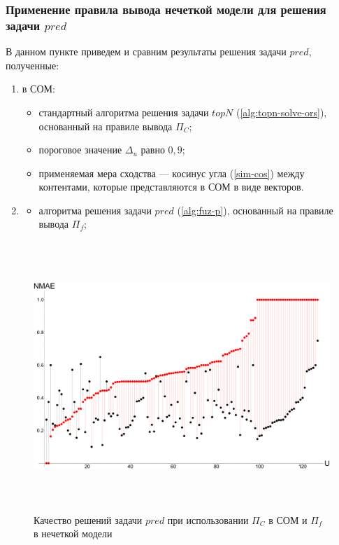 \subsubsection{Применение правила вывода нечеткой модели для решения задачи
$pred$}
В данном пункте приведем и сравним результаты решения задачи $pred$, полученные:
\begin{enumerate}
	\item в СОМ:
		\begin{itemize}
			\item
			стандартный алгоритма решения задачи
			$topN$ (\ref{alg:topn-solve-ors}), основанный на
			правиле вывода $\Pi_C$;
			\item
			пороговое значение $\Delta_u$ равно $0,9$;
			\item
		применяемая мера сходства --- косинус угла (\ref{sim-cos})
		между контентами, которые представляются в СОМ в виде векторов.
		\end{itemize}
	\item
		\begin{itemize}
			\item
			алгоритма решения задачи
			$pred$ (\ref{alg:fuz-p}), основанный на
			правиле вывода $\Pi_f$;
		\end{itemize}
\end{enumerate}


\begin{figure}[H]
	\caption{Качество решений задачи $pred$ при использовании $\Pi_C$ в СОМ и
	$\Pi_f$ в нечеткой модели}
	\label{pic:predpio_pif}
	\begin{center}
		\includegraphics[width=7in,height=4in]{pics/results/ub_vs_fuzzy.pdf}
\end{center}
\end{figure}

